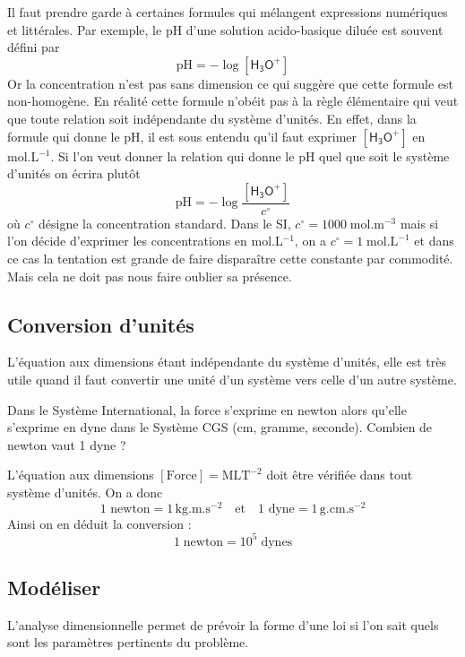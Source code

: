 \begin{kaoremark}
Il faut prendre garde à certaines formules qui mélangent expressions numériques et littérales. Par exemple, le pH d'une solution acido-basique diluée est souvent défini par 
	\[\text{pH}=-\log\left[\mathsf{H_3O^+}\right]\]
Or la concentration n'est pas sans dimension ce qui suggère que cette formule est non-homogène. En réalité cette formule n'obéit pas à la règle élémentaire qui veut que toute relation soit indépendante du système d'unités. En effet, dans la formule qui donne le pH, il est sous entendu qu'il faut exprimer $\left[\mathsf{H_3O^+}\right]$ en mol.L$^{-1}$. Si l'on veut donner la relation qui donne le pH quel que soit le système d'unités on écrira plutôt
	\[\text{pH}=-\log\frac{\left[\mathsf{H_3O^+}\right]}{c^{\circ}}\]
où $c^{\circ}$ désigne la concentration standard. Dans le SI, $c^{\circ}=1000\;\mathrm{mol.m^{-3}}$ mais si l'on décide d'exprimer les concentrations en mol.L$^{-1}$, on a $c^{\circ}=1\;\mathrm{mol.L^{-1}}$ et dans ce cas la tentation est grande de faire disparaître cette constante par commodité. Mais cela ne doit pas nous faire oublier sa présence.
\end{kaoremark} 



\subsection{Conversion d'unités}
L'équation aux dimensions étant indépendante du système d'unités, elle est très utile quand il faut convertir une unité d'un système vers celle d'un autre système. 

\begin{kaoexample}[frametitle=Exemple : la dyne]
Dans le Système International, la force s'exprime en newton alors qu'elle s'exprime en dyne dans le Système CGS (cm, gramme, seconde). Combien de newton vaut 1 dyne ?

L'équation aux dimensions $[\text{Force}]=\mathrm{MLT^{-2}}$ doit être vérifiée dans tout système d'unités. On a donc
	\[\text{1 newton}=\mathrm{1\, kg.m.s^{-2}}\quad\text{et}\quad \text{1 dyne}=\mathrm{1\, g.cm.s^{-2}}\]
Ainsi on en déduit la conversion : 
	\[1\;\mathrm{newton}=10^5\;\mathrm{dynes}\]
\end{kaoexample} 

\subsection{Modéliser}
L'analyse dimensionnelle permet de prévoir la forme d'une loi si l'on sait quels sont les paramètres pertinents du problème.

